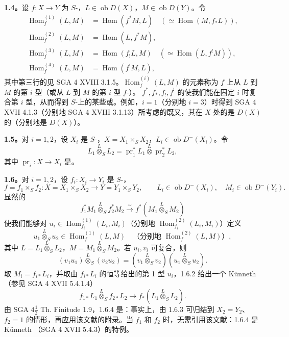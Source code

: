 \textbf{1.4。}设 $f:X\to Y$ 为 $S$-，$L\in\operatorname{ob}D(X)$，$M\in\operatorname{ob}D(Y)$。令
\begin{align*}
\operatorname{Hom}^{(1)}_f(L,M)&=\operatorname{Hom}(f^*M,L)\quad(\simeq\operatorname{Hom}(M,f_*L)),\\
\operatorname{Hom}^{(2)}_f(L,M)&=\operatorname{Hom}(L,f^*M),\\
\operatorname{Hom}^{(3)}_f(L,M)&=\operatorname{Hom}(f_!L,M)\quad(\simeq\operatorname{Hom}(L,f^!M)),\\
\operatorname{Hom}^{(4)}_f(L,M)&=\operatorname{Hom}(f^!M,L),
\end{align*}
其中第三行的见 SGA 4 XVIII 3.1.5。$\operatorname{Hom}^{(i)}_f(L,M)$ 的元素称为 $f$ 上从 $L$ 到 $M$ 的第 $i$ 型（或从 $L$ 到 $M$ 的第 $i$ 型 $f$-）。 $f^*,f_*,f_!,f^!$ 的使我们能在固定 $i$ 时复合第 $i$ 型，从而得到 $S$-上的某些或。例如，$i=1$（分别地 $i=3$）时得到 SGA 4 XVII 4.1.3（分别地 SGA 4 XVIII 3.1.13）所考虑的既又，其在 $X$ 处的是 $D(X)$ 的（分别地是 $D(X)$）。

\textbf{1.5。}对 $i=1,2$，设 $X_i$ 是 $S$-，$X=X_1\times_S X_2$，$L_i\in\operatorname{ob}D^-(X_i)$。令
\[
L_1\mathbin{\overset L\otimes}_S L_2=\operatorname{pr}_1^*L_1\mathbin{\overset L\otimes}\operatorname{pr}_2^*L_2,
\]
其中 $\operatorname{pr}_i:X\to X_i$ 是。

\textbf{1.6。}对 $i=1,2$，设 $f_i:X_i\to Y_i$ 是 $S$-，
\[
f=f_1\times_S f_2:X=X_1\times_S X_2\longrightarrow Y=Y_1\times_S Y_2,\qquad
L_i\in\operatorname{ob}D^-(X_i),\quad M_i\in\operatorname{ob}D^-(Y_i).
\]
显然的
\[
f_1^*M_1\mathbin{\overset L\otimes}_S f_2^*M_2\xrightarrow\sim
f^*(M_1\mathbin{\overset L\otimes}_S M_2)\tag{1.6.1}
\]
使我们能够对 $u_i\in\operatorname{Hom}^{(1)}_{f_i}(L_i,M_i)$（分别地 $\operatorname{Hom}^{(2)}_{f_i}(L_i,M_i)$）定义
\[
u_1\mathbin{\overset L\otimes}_S u_2\in\operatorname{Hom}^{(1)}_f(L,M)
\quad\text{（分别地 }\operatorname{Hom}^{(2)}_f(L,M)\text{）},\tag{1.6.2}
\]
其中 $L=L_1\mathbin{\overset L\otimes}_S L_2$，$M=M_1\mathbin{\overset L\otimes}_S M_2$。若 $u_i,v_i$ 可复合，则
\[
(v_1u_1)\mathbin{\overset L\otimes}_S(v_2u_2)
=(v_1\mathbin{\overset L\otimes}_S v_2)(u_1\mathbin{\overset L\otimes}_S u_2).\tag{1.6.3}
\]
取 $M_i=f_{i*}L_i$，并取由 $f_{i*}L_i$ 的恒等给出的第 1 型 $u_i$，1.6.2 给出一个 Künneth （参见 SGA 4 XVII 5.4.1.4）
\[
f_{1*}L_1\mathbin{\overset L\otimes}_S f_{2*}L_2\longrightarrow
f_*(L_1\mathbin{\overset L\otimes}_S L_2).\tag{1.6.4}
\]
由 SGA $4\frac12$ Th. Finitude 1.9，1.6.4 是：事实上，由 1.6.3 可归结到 $X_2=Y_2$、$f_2=1$ 的情形，再应用该文献的附录。当 $f_1$ 和 $f_2$ 时，无需引用该文献：1.6.4 是 Künneth （SGA 4 XVII 5.4.3）的特例。

